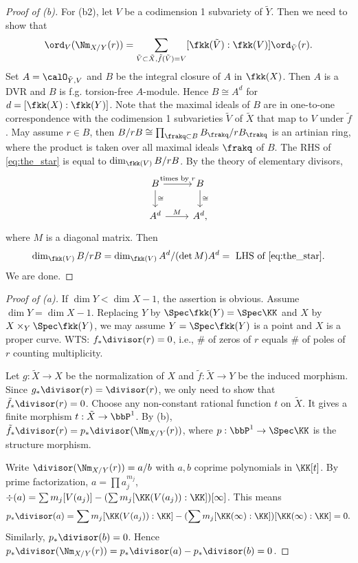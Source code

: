 \begin{proof}[Proof of (b)]
        For (b2), let \(V\) be a codimension 1 subvariety of \(\tilde{Y}\). 
        Then we need to show that
        \begin{equation}\label{eq:the_star}
            \ord_V(\Nm_{X/Y}(r)) = \sum_{\tilde{V} \subset \tilde{X}, \tilde{f}(\tilde{V}) = V} [\fkk(\tilde{V}):\fkk(V)] \ord_{\tilde{V}}(r).
        \end{equation} 
        Set \(A = \calO_{\tilde{Y},V}\) and \(B\) be the integral closure of \(A\) in \(\fkk(X)\).
        Then \(A\) is a DVR and \(B\) is f.g. torsion-free \(A\)-module.
        Hence \(B \cong A^d\) for \(d = [\fkk(X):\fkk(Y)]\).
        Note that the maximal ideals of \(B\) are in one-to-one correspondence with the codimension 1 subvarieties \(\tilde{V}\) of \(\tilde{X}\) that map to \(V\) under \(\tilde{f}\). 
        May assume \(r \in B\), then \(B/rB \cong \prod_{\frakq \subset B} B_\frakq / r B_\frakq\) is an artinian ring, where the product is taken over all maximal ideals \(\frakq\) of \(B\).
        The RHS of \eqref{eq:the_star} is equal to \(\dim_{\fkk(V)} B/rB\).
        By the theory of elementary divisors, 
        \[ \begin{tikzcd}
            B \ar[r, "\text{times by } r"] \ar[d, "\cong"] & B \ar[d, "\cong"] \\
            A^d \ar[r, "M"] & A^d,
        \end{tikzcd} \]
        where \(M\) is a diagonal matrix.
        Then 
        \[ \dim_{\fkk(V)} B/rB = \dim_{\fkk(V)} A^d / (\det M) A^d = \text{ LHS of \eqref{eq:the_star}}. \]
        We are done.
    \end{proof}
    \begin{proof}[Proof of (a)]
        If \(\dim Y < \dim X - 1\), the assertion is obvious.
        Assume \(\dim Y = \dim X - 1\).
        Replacing \(Y\) by \(\Spec \fkk(Y) = \Spec \KK\) and \(X\) by \(X \times_Y \Spec \fkk(Y)\), we may assume \(Y = \Spec \fkk(Y)\) is a point and \(X\) is a proper curve.
        WTS: \(f_*\divisor(r) = 0\), i.e., \# of zeros of \(r\) equals \# of poles of \(r\) counting multiplicity.
        
        Let \(g: \tilde{X} \to X\) be the normalization of \(X\) and \(\tilde{f}: \tilde{X} \to Y\) be the induced morphism.
        Since \(g_*\divisor(r) = \divisor(r)\), we only need to show that \(\tilde{f}_*\divisor(r) = 0\).
        Choose any non-constant rational function \(t\) on \(\tilde{X}\).
        It gives a finite morphism \(t: \tilde{X} \to \bbP^1\).
        By (b), \(\tilde{f}_*\divisor(r) = p_*\divisor(\Nm_{X/Y}(r))\), where \(p: \bbP^1 \to \Spec \KK\) is the structure morphism. 

        Write \(\divisor(\Nm_{X/Y}(r)) = a/b\) with \(a,b\) coprime polynomials in \(\KK[t]\). 
        By prime factorization, \(a = \prod a_j^{m_j}\), \(\div(a) = \sum m_j [V(a_j)] - (\sum m_j[\KK(V(a_j)):\KK]) [\infty]\).
        This means 
        \[p_*\divisor(a) = \sum m_j [\KK(V(a_j)):\KK] - (\sum m_j[\KK(\infty):\KK]) [\KK(\infty):\KK] = 0. \]
        Similarly, \(p_*\divisor(b) = 0\).
        Hence \(p_*\divisor(\Nm_{X/Y}(r)) = p_*\divisor(a) - p_*\divisor(b) = 0\).
    \end{proof}

